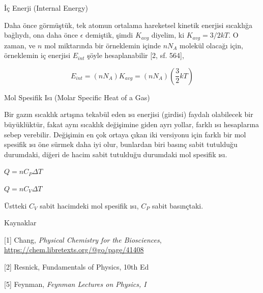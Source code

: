 \documentclass[12pt,fleqn]{article}\usepackage{../../common}
\begin{document}
İç Enerji (Internal Energy)

Daha önce görmüştük, tek atomun ortalama hareketsel kinetik enerjisi
sıcaklığa bağlıydı, ona daha önce $\epsilon$ demiştik, şimdi $K_{avg}$
diyelim, ki $K_{avg} = 3/2 k T$. O zaman, ve $n$ mol miktarında bir
örneklemin içinde $n N_A$ molekül olacağı için, örneklemin iç
enerjisi $E_{int}$ şöyle hesaplanabilir [2, sf. 564],

$$
E_{int} = (n N_A) K_{avg} = (n N_A) (\frac{3}{2} k T)
$$

Mol Spesifik Isı (Molar Specific Heat of a Gas)

Bir gazın sıcaklık artışına tekabül eden ısı enerjisi (girdisi) faydalı
olabilecek bir büyüklüktür, fakat aynı sıcaklık değişimine giden ayrı yollar,
farklı ısı hesaplarına sebep verebilir. Değişimin en çok ortaya çıkan iki
versiyonu için farklı bir mol spesifik ısı öne sürmek daha iyi olur, bunlardan
biri basınç sabit tutulduğu durumdaki, diğeri de hacim sabit tutulduğu
durumdaki mol spesifik ısı.

$Q = n C_P \Delta T$

$Q = n C_V \Delta T$

Üstteki $C_V$ sabit hacimdeki mol spesifik ısı, $C_P$ sabit basınçtaki.



Kaynaklar

[1] Chang, {\em Physical Chemistry for the Biosciences},
    \url{https://chem.libretexts.org/@go/page/41408}

[2] Resnick, Fundamentals of Physics, 10th Ed

[5] Feynman, {\em Feynman Lectures on Physics, I}
\end{document}
